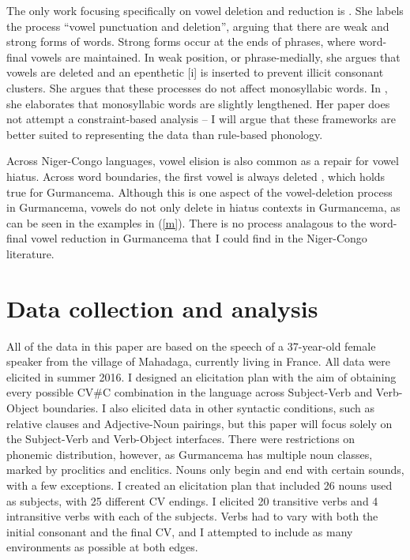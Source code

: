 \documentclass[output=paper,newtxmath,modfonts,nonflat,draftmode]{langsci/langscibook}
\begin{document}
The only work focusing specifically on vowel deletion and reduction is \citet{Rialland1980,Rialland2001}. She labels the process “vowel punctuation and deletion'', arguing that there are weak and strong forms of words.  Strong forms occur at the ends of phrases, where word-final vowels are maintained. In weak position, or phrase-medially, she argues that vowels are deleted and an epenthetic [i] is inserted to prevent illicit consonant clusters. She argues that these processes do not affect monosyllabic words. In \citet{Rialland2001}, she elaborates that monosyllabic words are slightly lengthened. Her paper does not attempt a constraint-based analysis -- I will argue that these frameworks are better suited to representing the data than rule-based phonology. 
	
Across Niger-Congo languages, vowel elision is also common as a repair for vowel hiatus. Across word boundaries, the first vowel is always deleted \citep{Casali1997}, which holds true for Gurmancema. Although this is one aspect of the vowel-deletion process in Gurmancema, vowels do not only delete in hiatus contexts in Gurmancema, as can be seen in the examples in (\ref{m}). There is no process analagous to the word-final vowel reduction in Gurmancema that I could find in the Niger-Congo literature. 
 
\section{Data collection and analysis}\label{sec:baird:4}

All of the data in this paper are based on the speech of a 37-year-old female speaker from the village of Mahadaga, currently living in France. All data were elicited in summer 2016. I designed an elicitation plan with the aim of obtaining every possible CV\#C combination in the language across Subject-Verb and Verb-Object boundaries. I also elicited data in other syntactic conditions, such as relative clauses and Adjective-Noun pairings, but this paper will focus solely on the Subject-Verb and Verb-Object interfaces. There were restrictions on phonemic distribution, however, as Gurmancema has multiple noun classes, marked by proclitics and enclitics.  Nouns only begin and end with certain sounds, with a few exceptions. I created an elicitation plan that included 26 nouns used as subjects, with 25 different CV endings. I elicited 20 transitive verbs and 4 intransitive verbs with each of the subjects. Verbs had to vary with both the initial consonant and the final CV, and I attempted to include as many environments as possible at both edges. 
\end{document}
